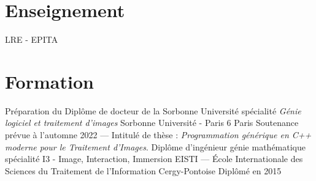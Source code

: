 \documentclass[11pt,a4paper,sans]{moderncv} %
\begin{document}



\section{Enseignement}
{LRE - EPITA}
{}
{}
{}
{}


\section{Formation}

\cventry{}
{Préparation du Diplôme de docteur de la Sorbonne Université spécialité \emph{Génie logiciel et traitement d'images}}
{Sorbonne Université - Paris 6}
{Paris}
{}
{Soutenance prévue à l'automne 2022 --- Intitulé de thèse : \emph{Programmation générique en C++ moderne pour le Traitement d'Images}.}
\cventry{}
{Diplôme d'ingénieur génie mathématique spécialité I3 - Image, Interaction, Immersion}
{EISTI --- École Internationale des Sciences du Traitement de l'Information}
{Cergy-Pontoise}
{}
{Diplômé en 2015}
\end{document}

